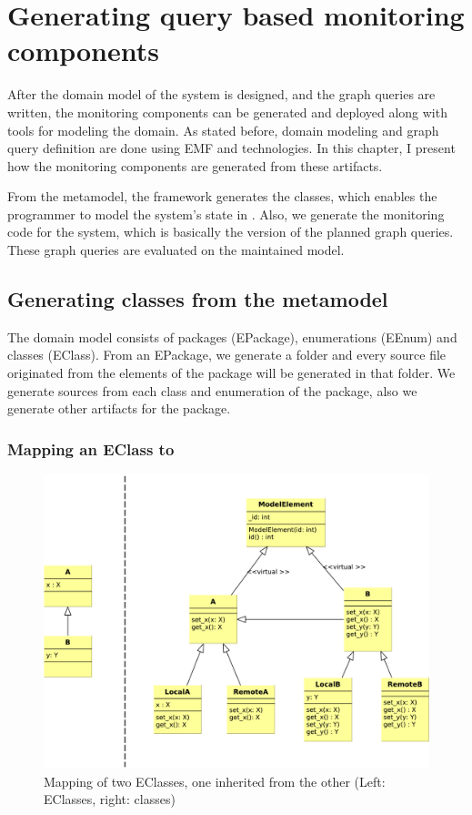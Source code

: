 \chapter{Generating query based monitoring components}

After the domain model of the system is designed, and the graph queries are written, the monitoring components can be generated and deployed along with \cpp{} tools for modeling the domain.
As stated before, domain modeling and graph query definition are done using EMF and \viatra{} technologies.
In this chapter, I present how the monitoring components are generated from these artifacts.

From the metamodel, the framework generates the classes, which enables the programmer to model the system's state in \cpp{}.
Also, we generate the monitoring code for the system, which is basically the \cpp{} version of the planned graph queries. 
These graph queries are evaluated on the maintained \cpp{} model.

\section{Generating classes from the metamodel}

The domain model consists of packages (EPackage), enumerations (EEnum) and classes (EClass).
From an EPackage, we generate a folder and every source file originated from the elements of the package will be generated in that folder. 
We generate sources from each class and enumeration of the package, also we generate other artifacts for the package.


\subsection{Mapping an EClass to \protect\cpp }


\begin{figure}
	\begin{center}
		\includegraphics[width=\textwidth]{figures/eclass-to-cpp.pdf}
		\caption{Mapping of two EClasses, one inherited from the other (Left: EClasses, right: \protect\cpp{} classes) }
		\label{fig:eclass-to-cpp}
	\end{center}
\end{figure}


